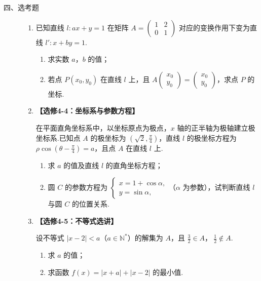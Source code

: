 \begin{description}

    \item[四、选考题]

    \begin{enumerate}[leftmargin=5pt]

      \addtocounter{enumi}{+20}

        \item 已知直线 \(l: ax + y = 1\) 在矩阵 \(A = \begin{pmatrix}1 & 2 \\ 0 & 1\end{pmatrix}\) 对应的变换作用下变为直线 \(l': x + by = 1\).

\begin{enumerate}
\item 求实数 \(a\)，\(b\) 的值；
\item 若点 \(P(x_0, y_0)\) 在直线 \(l\) 上，且 \(A \begin{pmatrix}x_0 \\ y_0\end{pmatrix} = \begin{pmatrix}x_0 \\ y_0\end{pmatrix}\)，求点 \(P\) 的坐标.
\end{enumerate}

        \item \textbf{【选修4-4：坐标系与参数方程】}

在平面直角坐标系中，以坐标原点为极点，\(x\) 轴的正半轴为极轴建立极坐标系.已知点 \(A\) 的极坐标为 \(\left(\sqrt{2}, \frac{\pi}{4}\right)\)，直线 \(l\) 的极坐标方程为 \(\rho \cos \left(\theta - \frac{\pi}{4}\right) = a\)，且点 \(A\) 在直线 \(l\) 上.

\begin{enumerate}
\item 求 \(a\) 的值及直线 \(l\) 的直角坐标方程；
\item 圆 \(C\) 的参数方程为 \(\begin{cases}
x = 1 + \cos \alpha,\\
y = \sin \alpha,
\end{cases}\)（\(\alpha\) 为参数），试判断直线 \(l\) 与圆 \(C\) 的位置关系.
\end{enumerate}

        \item \textbf{【选修4-5：不等式选讲】}

设不等式 \(|x - 2| < a\)（\(a \in \mathbb{N}^{*}\)）的解集为 \(A\)，且 \(\frac{3}{2} \in A\)，\(\ \frac{1}{2} \notin A\).

\begin{enumerate}
\item 求 \(a\) 的值；
\item 求函数 \(f(x) = |x + a| + |x - 2|\) 的最小值.
\end{enumerate}

    \end{enumerate}

\end{description}


